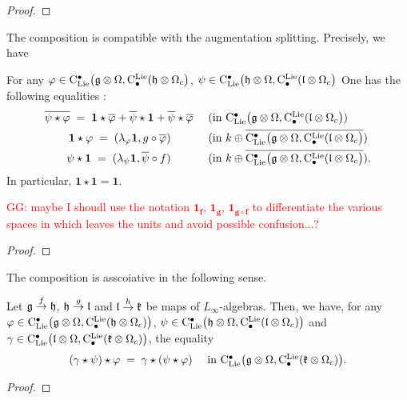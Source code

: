 \documentclass[11pt]{amsart}
\numberwithin{equation}{section}
\def\greg{\textcolor{red}{GG: }\textcolor{red}}
\begin{document}
\begin{proof}
 
\end{proof}
The composition is compatible with the augmentation splitting. Precisely, we have
\begin{lmm}\label{L:compisaugmented} For any $\varphi \in {\rm C}_{\rm Lie}^\bullet\big(\mathfrak g \otimes \Omega, {\rm C}^{\rm Lie}_\bullet(\mathfrak h \otimes \Omega_c  \big)$,
$\psi \in {\rm C}_{\rm Lie}^\bullet\big(\mathfrak h \otimes \Omega, {\rm C}^{\rm Lie}_\bullet(\mathfrak l \otimes \Omega_c  \big)$
 One has the following equalities  :
 \begin{align}
  \overline{\psi\star \varphi} \;= \;\mathbf{1}\star \overline{\varphi} +\overline{\psi}\star \mathbf{1} +\overline{\psi}\star \overline{\varphi} 
  & \quad\mbox{ (in  ${\rm C}_{\rm Lie}^\bullet\big(\mathfrak g \otimes \Omega, {\rm C}^{\rm Lie}_\bullet(\mathfrak l \otimes \Omega_c  \big) $)}\\
 \mathbf{1}\star \varphi \;=\;  (\lambda_\varphi \mathbf{1}, g\circ \overline{\varphi})\qquad
  &\quad\mbox{ (in  $k  \oplus \overline{{\rm C}_{\rm Lie}^\bullet\big(\mathfrak g \otimes \Omega, {\rm C}^{\rm Lie}_\bullet(\mathfrak l \otimes \Omega_c  \big)}$)}\\
  \psi \star \mathbf{1}\;=\; (\lambda_\psi \mathbf{1}, \overline{\psi} \circ f) \qquad
  &\quad\mbox{ (in  $k  \oplus \overline{{\rm C}_{\rm Lie}^\bullet\big(\mathfrak g \otimes \Omega, {\rm C}^{\rm Lie}_\bullet(\mathfrak l \otimes \Omega_c  \big)}$).}
 \end{align}
 In particular, $\mathbf{1} \star \mathbf{1} =\mathbf{1}$.
\end{lmm}
\greg{maybe I shoudl use the notation $\mathbf{1}_{\mathbf{f}}$, $\mathbf{1}_{\mathbf{g}}$, $\mathbf{1}_{\mathbf{g\circ f}}$ to differentiate 
the various spaces in which leaves the units and avoid possible confusion...?}
\begin{proof}
 
\end{proof}
The composition is asscoiative in the following sense.
\begin{lmm}\label{L:compisassociative} Let $\mathfrak g \stackrel{f}\to \mathfrak h$, $\mathfrak h \stackrel{g}\to \mathfrak l$ and $\mathfrak l \stackrel{h}\to \mathfrak{k}$ be maps of $L_\infty$-algebras.
 Then, we have, for any $\varphi \in {\rm C}_{\rm Lie}^\bullet\big(\mathfrak g\otimes \Omega, {\rm C}^{\rm Lie}_\bullet(\mathfrak h \otimes \Omega_c) \big)$, 
  $\psi \in {\rm C}_{\rm Lie}^\bullet\big(\mathfrak h\otimes \Omega, {\rm C}^{\rm Lie}_\bullet(\mathfrak l \otimes \Omega_c) \big)$ and  
  $\gamma \in {\rm C}_{\rm Lie}^\bullet\big(\mathfrak l\otimes \Omega, {\rm C}^{\rm Lie}_\bullet(\mathfrak{k} \otimes \Omega_c) \big)$, the equality 
  \[ (\gamma\star \psi)\star \varphi \;=\; \gamma\star (\psi \star \varphi) \quad \mbox{ in 
  ${\rm C}_{\rm Lie}^\bullet\big(\mathfrak g\otimes \Omega, {\rm C}^{\rm Lie}_\bullet(\mathfrak{k} \otimes \Omega_c) \big)$.}  \]
\end{lmm}
\begin{proof}
 
\end{proof}
\end{document}
